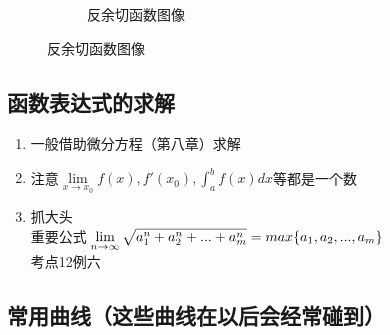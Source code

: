 \begin{enumerate}
\begin{enumerate}
\begin{enumerate}
\begin{figure}[H]
\begin{subfigure}{.475\linewidth}
            \end{subfigure}
            \begin{subfigure}{.475\linewidth}
            \caption{反余切函数图像}
            \end{subfigure}
            \end{figure}
            \end{enumerate}
    \end{enumerate}


\end{enumerate}

\subsection{函数表达式的求解}

\begin{enumerate}
    \item 一般借助微分方程（第八章）求解
    \item 注意$\lim \limits_{x\to x_0}f(x),f'(x_0),\int_{a}^{b}f(x)dx$等都是一个数
    \item 抓大头\\
    重要公式$\displaystyle\hspace{.2em}\lim \limits_{n\to \infty}\sqrt{a_1^n+a_2^n+...+a_m^n}=max\{a_1,a_2,...,a_m\}$\\
    考点12例六

\end{enumerate}

\subsection{常用曲线（这些曲线在以后会经常碰到）}

